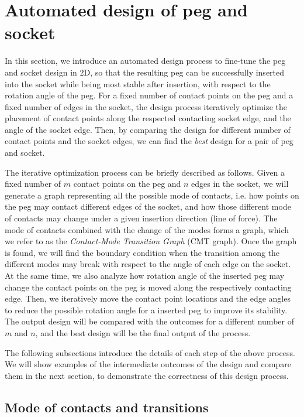 

\section{Automated design of peg and socket}


In this section, we introduce an automated design process to fine-tune the peg and socket design in 2D, so that the resulting peg can be successfully inserted into the socket while being most stable after insertion, with respect to the rotation angle of the peg. For a fixed number of contact points on the peg and a fixed number of edges in the socket, the design process iteratively optimize the placement of contact points along the respected contacting socket edge, and the angle of the socket edge. Then, by comparing the design for different number of contact points and the socket edges, we can find the {\em best} design for a pair of peg and socket. 

The iterative optimization process can be briefly described as follows. Given a fixed number of $m$ contact points on the peg and $n$ edges in the socket, we will generate a graph representing all the possible mode of contacts, i.e. how points on the peg may contact different edges of the socket, and how those different mode of contacts may change under a given insertion direction (line of force). The mode of contacts combined with the change of the modes forms a graph, which we refer to as the {\em Contact-Mode Transition Graph} (CMT graph). Once the graph is found, we will find the boundary condition when the transition among the different modes may break with respect to the angle of each edge on the socket. At the same time, we also analyze how rotation angle of the inserted peg may change the contact points on the peg is moved along the respectively contacting edge. Then, we iteratively move the contact point locations and the edge angles to reduce the possible rotation angle for a inserted peg to improve its stability. The output design will be compared with the outcomes for a different number of $m$ and $n$, and the best design will be the final output of the process. 

The following subsections introduce the details of each step of the above process. We will show examples of the intermediate outcomes of the design and compare them in the next section, to demonstrate the correctness of this design process. 


\subsection{Mode of contacts and transitions}

